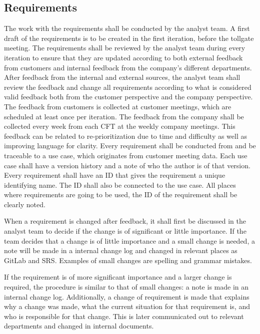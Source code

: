 \subsection{Requirements}
The work with the requirements shall be conducted by the analyst team. A first draft of the requirements is to be created in the first iteration, before the tollgate meeting. The requirements shall be reviewed by the analyst team during every iteration to ensure that they are updated according to both external feedback from customers and internal feedback from the company's different departments. After feedback from the internal and external sources, the analyst team shall review the feedback and change all requirements according to what is considered valid feedback both from the customer perspective and the company perspective. The feedback from customers is collected at customer meetings, which are scheduled at least once per iteration. The feedback from the company shall be collected every week from each CFT at the weekly company meetings. This feedback can be related to re-prioritization due to time and difficulty as well as improving language for clarity. 
Every requirement shall be conducted from and be traceable to a use case, which originates from customer meeting data. Each use case shall have a version history and a note of who the author is of that version. Every requirement shall have an ID that gives the requirement a unique identifying name. The ID shall also be connected to the use case. All places where requirements are going to be used, the ID of the requirement shall be clearly noted. 

When a requirement is changed after feedback, it shall first be discussed in the analyst team to decide if the change is of significant or little importance. If the team decides that a change is of little importance and a small change is needed, a note will be made in a internal change log and changed in relevant places as GitLab and SRS. Examples of small changes are spelling and grammar mistakes. 

If the requirement is of more significant importance and a larger change is required, the procedure is similar to that of small changes: a note is made in an internal change log. Additionally, a change of requirement is made that explains why a change was made, what the current situation for that requirement is, and who is responsible for that change. This is later communicated out to relevant departments and changed in internal documents. 

